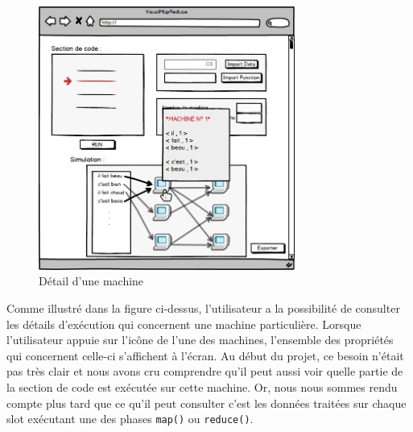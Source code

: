 \begin{figure}[H]
  \centering
    \includegraphics[width=0.75\textwidth]{images/interface/page_interpret3.png}
    \caption{Détail d'une machine}
    \label{fig:detail}
\end{figure}

Comme illustré dans la figure ci-dessus, l'utilisateur a la possibilité de consulter les détails d'exécution qui concernent une machine particulière. Lorsque l'utilisateur appuie sur l'icône de l'une des machines, l'ensemble des propriétés qui concernent celle-ci s'affichent à l'écran. Au début du projet, ce besoin n'était pas très clair et nous avons cru comprendre qu'il peut aussi voir quelle partie de la section de code est exécutée sur cette machine. Or, nous nous sommes rendu compte plus tard que ce qu'il peut consulter c'est les données traitées sur chaque slot exécutant une des phases {\tt map()} ou {\tt reduce()}.